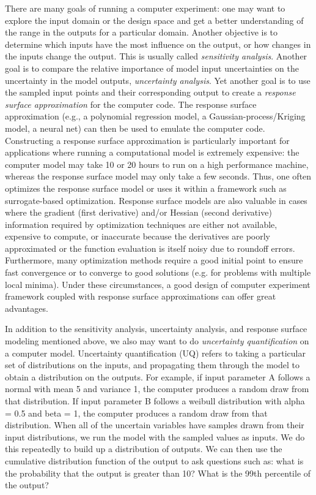 There are many goals of running a computer experiment: one may want to 
explore the input domain or the design space and get a better understanding 
of the range in the outputs for a particular domain.  Another objective is 
to determine which inputs have the most influence on the output, or how 
changes in the inputs change the output.  This is usually called 
\emph{sensitivity analysis}. Another goal is to compare the relative 
importance of model input uncertainties on the uncertainty in the model 
outputs, \emph{uncertainty analysis}.  Yet another goal is to use the 
sampled input points and their corresponding output to create a 
\emph{response surface approximation} for the computer code.  The response 
surface approximation (e.g., a polynomial regression model, a 
Gaussian-process/Kriging model, a neural net) can then be used to emulate 
the computer code.   
Constructing a response surface approximation is particularly important 
for applications where running a computational model is extremely expensive:  
the computer model may take 10 or 20 hours to run on a high performance 
machine, whereas the response surface model may only take a few seconds.  
Thus, one often optimizes the response surface model or uses it within a 
framework such as surrogate-based optimization.   Response surface models 
are also valuable in cases where the gradient (first derivative) and/or 
Hessian (second derivative) information required by optimization techniques 
are either not available, expensive to compute, or inaccurate because the 
derivatives are poorly approximated or the function evaluation is itself 
noisy due to roundoff errors.  Furthermore, many optimization methods 
require a good initial point to ensure fast convergence or to converge to 
good solutions (e.g. for problems with multiple local minima).  Under these 
circumstances, a good design of computer experiment framework coupled with 
response surface approximations can offer great advantages. 

In addition to the sensitivity analysis, uncertainty analysis, and response 
surface modeling mentioned above, we also may want to do 
\emph{uncertainty quantification} on a computer model.  
Uncertainty quantification (UQ) refers to taking a particular set of 
distributions on the inputs, and propagating them through the model to 
obtain a distribution on the outputs.  For example, if input parameter A 
follows a normal with mean 5 and variance 1, the computer produces a random 
draw from that distribution.  If input parameter B follows a weibull 
distribution with alpha = 0.5 and beta = 1, the computer produces a random 
draw from that distribution.  When all of the uncertain variables have 
samples drawn from their input distributions, we run the model with the 
sampled values as inputs.  We do this repeatedly to build up a distribution 
of outputs.  We can then use the cumulative distribution function of the 
output to ask questions such as:  what is the probability that the output is 
greater than 10?   What is the 99th percentile of the output?  

